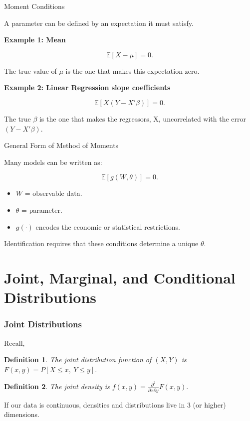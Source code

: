 \documentclass[aspectratio=169, handout, t]{beamer}
\newtheorem{defn}{Definition}
\numberwithin{equation}{section}
\begin{document}
\begin{frame}{Moment Conditions}

A parameter can be defined by an expectation it must satisfy.

\vspace{0.4cm}

\textbf{Example 1: Mean}

\[
\mathbb{E}[X - \mu] = 0.
\]

The true value of $\mu$ is the one that makes this expectation zero.

\vspace{0.4cm}

\textbf{Example 2: Linear Regression slope coefficients}

\[
\mathbb{E}\left[X (Y - X'\beta)\right] = 0.
\]

The true $\beta$ is the one that makes the regressors, X, uncorrelated
with the error $(Y-X'\beta).$

\vspace{0.4cm}

\end{frame}

\begin{frame}{General Form of Method of Moments}

Many models can be written as:

\[
\mathbb{E}[g(W, \theta)] = 0.
\]

\vspace{0.3cm}

\begin{itemize}
    \item $W$ = observable data.
    \item $\theta$ = parameter.
    \item $g(\cdot)$ encodes the economic or statistical restrictions.
\end{itemize}

\vspace{0.4cm}

Identification requires that these conditions determine a unique $\theta$.
\end{frame}
\section[CEF]{Joint, Marginal, and Conditional Distributions}

\begin{frame}
\frametitle{Joint Distributions}
Recall,
\begin{defn}
The joint distribution function of $(X,Y)$ is $F(x,y)=P[X\leq x,\ Y\leq y].$
\end{defn}
\begin{defn}
The joint density is
$f(x,y)=\frac{\partial^2}{\partial x \partial y} F(x,y).$
\end{defn}\pause
\bigskip
If our data is continuous, densities and distributions live in 3 (or higher) dimensions.
\end{frame}
\end{document}
